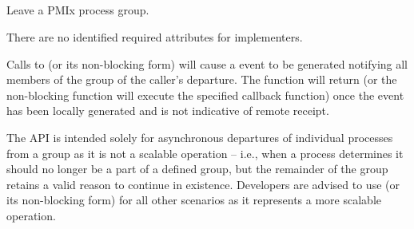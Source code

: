 \subsection{}

\summary

Leave a \ac{PMIx} process group.

\format


\begin{arglist}
\end{arglist}

\returnsimple

\reqattrstart
There are no identified required attributes for implementers.
\reqattrend


\descr

Calls to  (or its non-blocking form) will cause a  event to be generated notifying all members of the group of the caller’s departure. The function will return (or the non-blocking function will execute the specified callback function) once the event has been locally generated and is not indicative of remote receipt.

\adviceuserstart
The  API is intended solely for asynchronous departures of individual processes from a group as it is not a scalable operation – i.e., when a process determines it should no longer be a part of a defined group, but the remainder of the group retains a valid reason to continue in existence. Developers are advised to use  (or its non-blocking form) for all other scenarios as it represents a more scalable operation.
\adviceuserend

